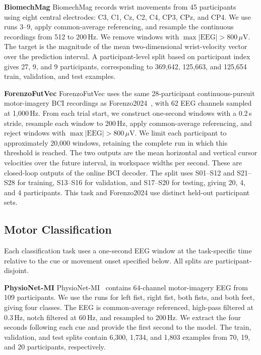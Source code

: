 \noindent\textbf{BiomechMag}
BiomechMag records wrist movements from 45 participants~\citep{perezblanco2026wrist} using eight central electrodes: C3, C1, Cz, C2, C4, CP3, CPz, and CP4. We use runs 3--9, apply common-average referencing, and resample the continuous recordings from 512 to 200\,Hz. We remove windows with $\max |\mathrm{EEG}|>800\,\mu$V. The target is the magnitude of the mean two-dimensional wrist-velocity vector over the prediction interval. A participant-level split based on participant index gives 27, 9, and 9 participants, corresponding to 369,642, 125,663, and 125,654 train, validation, and test examples.

\noindent\textbf{ForenzoFutVec}
ForenzoFutVec uses the same 28-participant continuous-pursuit motor-imagery BCI recordings as Forenzo2024~\citep{forenzo2024continuous}, with 62 EEG channels sampled at 1,000\,Hz. From each trial start, we construct one-second windows with a $0.2$\,s stride, resample each window to 200\,Hz, apply common-average referencing, and reject windows with $\max |\mathrm{EEG}|>800\,\mu$V. We limit each participant to approximately 20,000 windows, retaining the complete run in which this threshold is reached. The two outputs are the mean horizontal and vertical cursor velocities over the future interval, in workspace widths per second. These are closed-loop outputs of the online BCI decoder. The split uses S01--S12 and S21--S28 for training, S13--S16 for validation, and S17--S20 for testing, giving 20, 4, and 4 participants. This task and Forenzo2024 use distinct held-out participant sets.

\subsection{Motor Classification}

Each classification task uses a one-second EEG window at the task-specific time relative to the cue or movement onset specified below. All splits are participant-disjoint.

\noindent\textbf{PhysioNet-MI}
PhysioNet-MI~\citep{schalk2009eegmmidb} contains 64-channel motor-imagery EEG from 109 participants. We use the runs for left fist, right fist, both fists, and both feet, giving four classes. The EEG is common-average referenced, high-pass filtered at 0.3\,Hz, notch filtered at 60\,Hz, and resampled to 200\,Hz. We extract the four seconds following each cue and provide the first second to the model. The train, validation, and test splits contain 6,300, 1,734, and 1,803 examples from 70, 19, and 20 participants, respectively.

